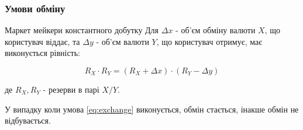 \documentclass{beamer}
\begin{document}
\begin{frame}
\begin{columns}
\begin{column}{.5\textwidth}
{
			}
		\end{column}
	\end{columns}
	\vspace{2em}
\end{frame}

\begin{frame}\frametitle{Умови обміну}

	\begin{block}{Маркет мейкери константного добутку}
		Для $\Delta x$ - об'єм обміну валюти $X$, що користувач віддає, та $\Delta y$ - об'єм
		валюти $Y$, що користувач отримує, має виконується рівність:

		\begin{equation}\label{eq:exchange}
			R_{X} \cdot R_{Y} = (R_{X} + \Delta x) \cdot (R_{Y} - \Delta y)
		\end{equation}

		де $R_{X}, R_{Y}$ - резерви в парі $X/Y$.
	\end{block}

	У випадку коли умова \eqref{eq:exchange} виконується, обмін стається, інакше обмін не відбувається.
\end{frame}
\end{document}
